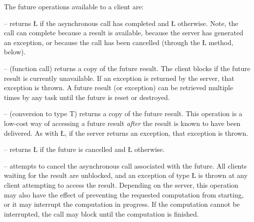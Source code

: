 \documentclass[openright,twoside]{report}
\begin{document}
The future operations available to a client are:
\begin{prefix}
\item[\LGinlinetrue\LGbegin\lgrinde\L{\LB{\V{available}}}\endlgrinde\LGend{}]
-- returns \LGinlinetrue\LGbegin\lgrinde\L{}\endlgrinde\LGend{} if the asynchronous call has completed and \LGinlinetrue\LGbegin\lgrinde\L{}\endlgrinde\LGend{} otherwise.
Note, the call can complete because a result is available, because the server has generated an exception, or because the call has been cancelled (through the \LGinlinetrue\LGbegin\lgrinde\L{}\endlgrinde\LGend{} method, below).
\item[\LGinlinetrue\LGbegin\lgrinde\L{\LB{\K{operator}()}}\endlgrinde\LGend{}]
-- (function call) returns a copy of the future result.
The client blocks if the future result is currently unavailable.
If an exception is returned by the server, that exception is thrown.
A future result (or exception) can be retrieved multiple times by any task until the future is reset or destroyed.
\item[\LGinlinetrue\LGbegin\lgrinde\L{\LB{\K{operator}\0\V{T}}}\endlgrinde\LGend{}]
-- (conversion to type T) returns a copy of the future result.
This operation is a low-cost way of accessing a future result \emph{after} the result is known to have been delivered.
As with \LGinlinetrue\LGbegin\lgrinde\L{}\endlgrinde\LGend{}, if the server returns an exception, that exception is thrown.
\item[\LGinlinetrue\LGbegin\lgrinde\L{\LB{\V{cancelled}}}\endlgrinde\LGend{}]
-- returns \LGinlinetrue\LGbegin\lgrinde\L{}\endlgrinde\LGend{} if the future is cancelled and \LGinlinetrue\LGbegin\lgrinde\L{}\endlgrinde\LGend{} otherwise.
\item[\LGinlinetrue\LGbegin\lgrinde\L{\LB{\V{cancel}}}\endlgrinde\LGend{}]
\begin{sloppypar}
-- attempts to cancel the asynchronous call associated with the future.
All clients waiting for the result are unblocked, and an exception of type \LGinlinetrue\LGbegin\lgrinde\L{}\endlgrinde\LGend{} is thrown at any client attempting to access the result.
Depending on the server, this operation may also have the effect of preventing the requested computation from starting, or it may interrupt the computation in progress.
If the computation cannot be interrupted, the call may block until the computation is finished.
\end{sloppypar}
\end{prefix}
\end{document}
